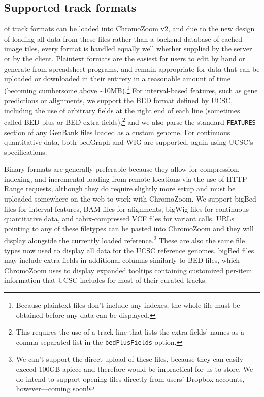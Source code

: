 \subsection{Supported track formats}

 of track formats can be loaded into ChromoZoom v2, and due to the new design of loading all data from these files rather than a backend database of cached image tiles, every format is handled equally well whether supplied by the server or by the client. Plaintext formats are the easiest for users to edit by hand or generate from spreadsheet programs, and remain appropriate for data that can be uploaded or downloaded in their entirety in a reasonable amount of time (becoming cumbersome above \textasciitilde{}10MB).\footnote{Because plaintext files don't include any indexes, the whole file must be obtained before any data can be displayed.} For interval-based features, such as gene predictions or alignments, we support the BED format defined by UCSC, including the use of arbitrary fields at the right end of each line (sometimes called BED plus or BED extra fields),\footnote{This requires the use of a track line that lists the extra fields' names as a comma-separated list in the \texttt{bedPlusFields} option.} and we also parse the standard \texttt{FEATURES} section of any GenBank files loaded as a custom genome. For continuous quantitative data, both bedGraph and WIG are supported, again using UCSC's specifications.

Binary formats are generally preferable because they allow for compression, indexing, and incremental loading from remote locations via the use of HTTP Range requests,\autocite{Li2009b,Li2011,Kent2010} although they do require slightly more setup and must be uploaded somewhere on the web to work with ChromoZoom. We support bigBed files for interval features, BAM files for alignments, bigWig files for continuous quantitative data, and tabix-compressed VCF files for variant calls. URLs pointing to any of these filetypes can be pasted into ChromoZoom and they will display alongside the currently loaded reference.\footnote{We can't support the direct upload of these files, because they can easily exceed 100GB apiece and therefore would be impractical for us to store. We do intend to support opening files directly from users' Dropbox accounts, however—coming soon!} These are also the same file types now used to display all data for the UCSC reference genomes. bigBed files may include extra fields in additional columns similarly to BED files, which ChromoZoom uses to display expanded tooltips containing customized per-item information that UCSC includes for most of their curated tracks.

